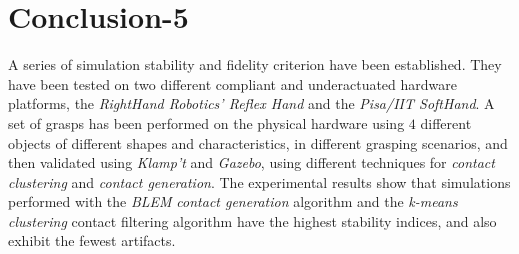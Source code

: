 \section{Conclusion-5}
\label{conclusions5}

A series of simulation stability and fidelity criterion have been established. They have been tested on two different compliant and underactuated hardware platforms, the \emph{RightHand Robotics' Reflex Hand} and the \emph{Pisa/IIT SoftHand}. A set of grasps has been performed on the physical hardware using $4$ different objects of different shapes and characteristics, in different grasping scenarios, and then validated using \emph{Klamp't} and \emph{Gazebo}, using different techniques for \emph{contact clustering} and \emph{contact generation}. The experimental results show that  simulations performed with the \emph{BLEM} \emph{contact generation} algorithm and the \emph{k-means clustering} contact filtering algorithm have the highest stability indices, and also exhibit the fewest artifacts.

